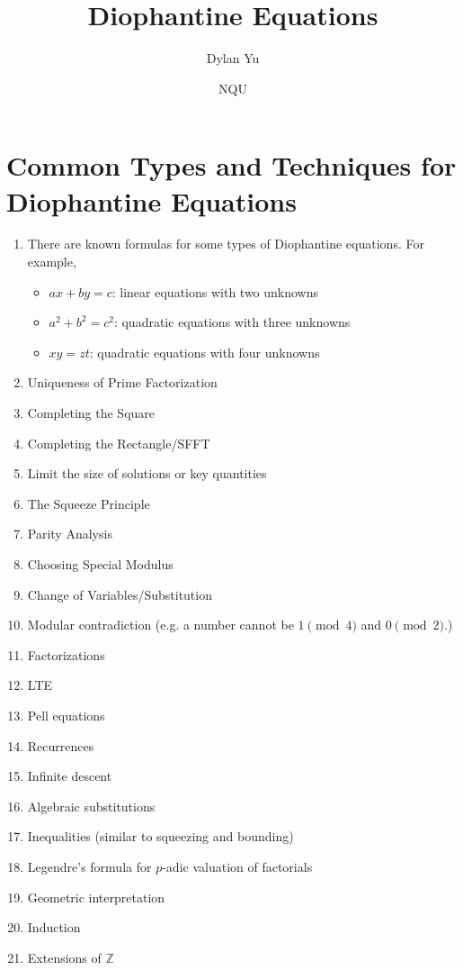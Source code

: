 \documentclass{article}
\title{Diophantine Equations}
\author{Dylan Yu}
\date{NQU}
\begin{document}
\maketitle

\section{Common Types and Techniques for Diophantine Equations}
\begin{enumerate}
    \item There are known formulas for some types of Diophantine equations. For example,
    \begin{itemize}
        \item $ax+by=c$: linear equations with two unknowns
        \item $a^2+b^2=c^2$: quadratic equations with three unknowns
        \item $xy=zt$: quadratic equations with four unknowns
    \end{itemize}
    \item Uniqueness of Prime Factorization
    \item Completing the Square
    \item Completing the Rectangle/SFFT
    \item Limit the size of solutions or key quantities
    \item The Squeeze Principle
    \item Parity Analysis
    \item Choosing Special Modulus
    \item Change of Variables/Substitution
    \item Modular contradiction (e.g. a number cannot be $1\pmod{4}$ and $0\pmod{2}$.)
    \item Factorizations
    \item LTE
    \item Pell equations
    \item Recurrences
    \item Infinite descent
    \item Algebraic substitutions
    \item Inequalities (similar to squeezing and bounding)
    \item Legendre's formula for $p$-adic valuation of factorials
    \item Geometric interpretation
    \item Induction
    \item Extensions of $\mathbb{Z}$
\end{enumerate}
\end{document}
